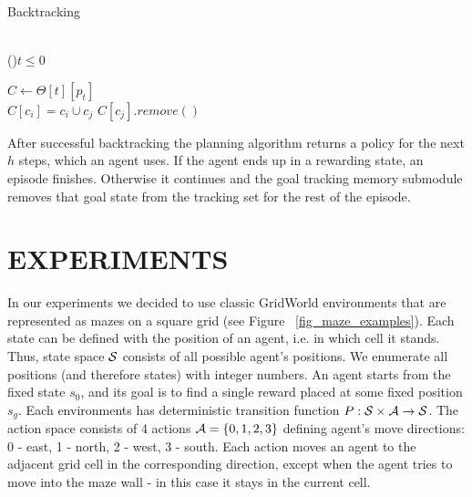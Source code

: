 \documentclass[a4paper,twoside]{article}
\begin{document}
\begin{algorithm}
  \caption{Backtracking} \label{alg_Backtracking}
  \quad \\
  
  \If(){$t \leq 0$} {
  }{}

  $C \gets \Theta[t][p_t]$ \;
  \quad \\

   {
    $C[c_i] = c_i \cup c_j$ \;
    $C[c_j].remove()$ \;
  }
  \quad \\


\end{algorithm}

After successful backtracking the planning algorithm returns a policy for the next $h$ steps, which an agent uses. If the agent ends up in a rewarding state, an episode finishes. Otherwise it continues and the goal tracking memory submodule removes that goal state from the tracking set for the rest of the episode.

\section{\uppercase{Experiments}}

In our experiments we decided to use classic GridWorld environments that are represented as mazes on a square grid (see Figure ~\ref{fig_maze_examples}). Each state can be defined with the position of an agent, i.e. in which cell it stands. Thus, state space $\mathcal{S}$ consists of all possible agent's positions. We enumerate all positions (and therefore states) with integer numbers. An agent starts from the fixed state $s_0$, and its goal is to find a single reward placed at some fixed position $s_g$. Each environments has deterministic transition function $P: \mathcal{S} \times \mathcal{A} \rightarrow \mathcal{S}$. The action space consists of 4 actions $\mathcal{A} = \{ 0, 1, 2, 3 \}$ defining agent's move directions: 0 - east, 1 - north, 2 - west, 3 - south. Each action moves an agent to the adjacent grid cell in the corresponding direction, except when the agent tries to move into the maze wall - in this case it stays in the current cell.
\end{document}
